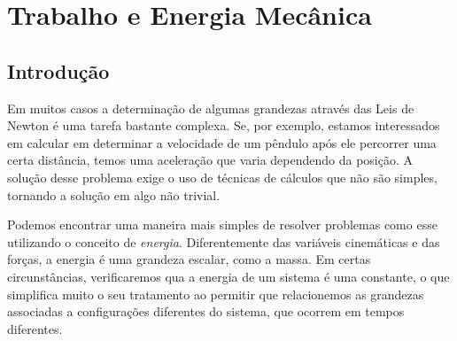 \chapter{Trabalho e Energia Mecânica}
\label{Chap:Energia}





\begin{fullwidth}
{\it



}
\end{fullwidth}

\section{Introdução} 

Em muitos casos a determinação de algumas grandezas através das Leis de Newton é uma tarefa bastante complexa. Se, por exemplo, estamos interessados em calcular em determinar a velocidade de um pêndulo após ele percorrer uma certa distância, temos uma aceleração que varia dependendo da posição. A solução desse problema exige o uso de técnicas de cálculos que não são simples, tornando a solução em algo não trivial.

Podemos encontrar uma maneira mais simples de resolver problemas como esse utilizando o conceito de \emph{energia}. Diferentemente das variáveis cinemáticas e das forças, a energia é uma grandeza escalar, como a massa. Em certas circunstâncias, verificaremos qua a energia de um sistema é uma constante, o que simplifica muito o seu tratamento ao permitir que relacionemos as grandezas associadas a configurações diferentes do sistema, que ocorrem em tempos diferentes.


